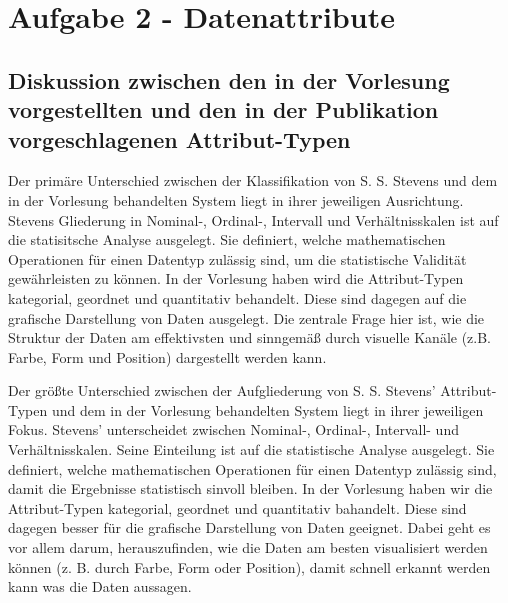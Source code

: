 \documentclass[10pt, a4paper]{article}
\begin{document}
% 


\section*{Aufgabe 2 - Datenattribute}
\subsection*{Diskussion zwischen den in der Vorlesung vorgestellten und den in der Publikation vorgeschlagenen Attribut-Typen}

Der primäre Unterschied zwischen der Klassifikation von S. S. Stevens und dem in der Vorlesung behandelten System liegt in ihrer jeweiligen Ausrichtung.
Stevens Gliederung in Nominal-, Ordinal-, Intervall und Verhältnisskalen ist auf die statisitsche Analyse ausgelegt.
Sie definiert, welche mathematischen Operationen für einen Datentyp zulässig sind, um die statistische Validität gewährleisten zu können.
In der Vorlesung haben wird die Attribut-Typen kategorial, geordnet und quantitativ behandelt. Diese sind dagegen auf die grafische Darstellung von Daten
ausgelegt. Die zentrale Frage hier ist, wie die Struktur der Daten am effektivsten und sinngemäß durch visuelle Kanäle (z.B. Farbe, Form und Position) dargestellt werden kann.

Der größte Unterschied zwischen der Aufgliederung von S. S. Stevens' Attribut-Typen und dem in der Vorlesung behandelten System liegt in ihrer jeweiligen Fokus.
Stevens' unterscheidet zwischen Nominal-, Ordinal-, Intervall- und Verhältnisskalen. Seine Einteilung ist auf die statistische Analyse ausgelegt.
Sie definiert, welche mathematischen Operationen für einen Datentyp zulässig sind, damit die Ergebnisse statistisch sinvoll bleiben.
In der Vorlesung haben wir die Attribut-Typen kategorial, geordnet und quantitativ bahandelt. Diese sind dagegen besser für die grafische Darstellung von Daten geeignet. 
Dabei geht es vor allem darum, herauszufinden, wie die Daten am besten visualisiert werden können 
(z. B. durch Farbe, Form oder Position), damit schnell erkannt werden kann was die Daten aussagen.
\end{document}

